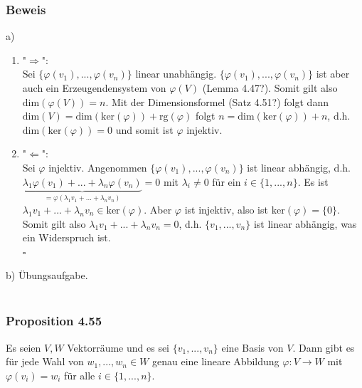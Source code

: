 \documentclass{article}
\begin{document}
\subsubsection*{Beweis}
a) \begin{enumerate}
    \item "$\Rightarrow$": \\
    Sei $\{\varphi(v_1),...,\varphi(v_n)\}$ linear unabhängig. $\{\varphi(v_1),...,\varphi(v_n)\}$ ist aber auch ein Erzeugendensystem von $\varphi(V)$ (Lemma 4.47?). Somit gilt also $\text{dim}(\varphi(V)) = n$.
    Mit der Dimensionsformel (Satz 4.51?) folgt dann $\text{dim}(V) = \text{dim}(\text{ker}(\varphi)) + \text{rg}(\varphi)$ folgt $n = \text{dim}(\text{ker}(\varphi)) + n$, d.h. $\text{dim}(\text{ker}(\varphi)) = 0$ und somit ist $\varphi$ injektiv. \\
    \item "$\Leftarrow$": \\
    Sei $\varphi$ injektiv. Angenommen $\{\varphi(v_1),...,\varphi(v_n)\}$ ist linear abhängig, d.h. $\underbrace{\lambda_1 \varphi(v_1) + ... + \lambda_n \varphi(v_n)}_{=\varphi(\lambda_1 v_1 + ... + \lambda_n v_n)} = 0$ mit $\lambda_i \neq 0$ für ein $i \in \{1,...,n\}$.
    Es ist $\lambda_1 v_1 + ... + \lambda_n v_n \in \text{ker}(\varphi)$. Aber $\varphi$ ist injektiv, also ist $\text{ker}(\varphi) = \{0\}$. 
    Somit gilt also $\lambda_1 v_1 + ... + \lambda_n v_n = 0$, d.h. $\{v_1,...,v_n\}$ ist linear abhängig, was ein Widerspruch ist. \\
    $\square$ \\
\end{enumerate}
b) Übungsaufgabe. \\
\\
\subsubsection*{Proposition 4.55}
Es seien $V, W$ Vektorräume und es sei $\{v_1,...,v_n\}$ eine Basis von $V$. Dann gibt es für jede Wahl von $w_1,...,w_n \in W$ genau eine lineare Abbildung $\varphi: V \rightarrow W$ mit $\varphi(v_i) = w_i$ für alle $i \in \{1,...,n\}$. \\
\\
\end{document}
